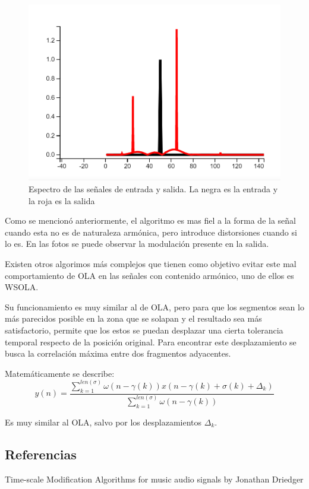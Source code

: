 \documentclass[assd_tp2_main.tex]{subfiles}
\begin{document}
\begin{figure}[H]	
	\centering
	\includegraphics[scale=0.5]{graficos/EJ6/senoespectro.png}
	\caption{Espectro de las señales de entrada y salida. La negra es la entrada y la roja es la salida}
\end{figure}

Como se mencionó anteriormente, el algoritmo es mas fiel a la forma de la señal cuando esta no es de naturaleza armónica, pero introduce distorsiones cuando si lo es. En las fotos se puede observar la modulación presente en la salida.

Existen otros algorimos más complejos que tienen como objetivo evitar este mal comportamiento de OLA en las señales con contenido armónico, uno de ellos es WSOLA.

Su funcionamiento es muy similar al de OLA, pero para que los segmentos sean lo más parecidos posible en la zona que se solapan y el resultado sea más satisfactorio, permite que los estos se puedan desplazar una cierta tolerancia temporal respecto de la posición original. Para encontrar este desplazamiento se busca la correlación máxima entre dos fragmentos adyacentes.

Matemáticamente se describe:
\begin{equation}
y(n)=\frac{\sum_{k=1}^{len(\sigma)} \omega(n - \gamma (k)) x(n-\gamma (k) + \sigma (k) + \Delta_{k})}{\sum_{k=1}^{len(\sigma)}\omega(n - \gamma (k))}
\end{equation}

Es muy similar al OLA, salvo por los desplazamientos $\Delta_{k}$.

\subsection*{Referencias}
Time-scale Modification Algorithms for music audio signals by Jonathan Driedger
\end{document}
